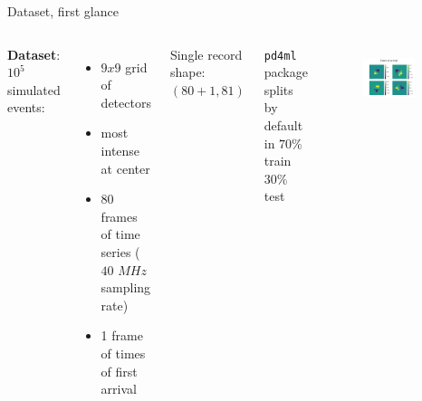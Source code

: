 \documentclass{beamer}
\begin{document}
\begin{frame}{Dataset, first glance}

    \begin{columns}
    
    \textbf{Dataset}: $10^5$ simulated events:
    \vspace{5 pt}

    \begin{itemize}
        \item[\textbullet] $9 x 9$ grid of detectors
        \item[\textbullet] most intense at center 
        \item[\textbullet] 80 frames of time series ($40$ $\si{MHz}$ sampling rate)
        \item[\textbullet] 1 frame of times of first arrival 
    \end{itemize}
    \vspace{10 pt}

    Single record shape: $(80 + 1 , 81)$\\
    \vspace{15 pt}

    \texttt{pd4ml} package splits by default in $70\%$ train $30\%$ test
    
    
        \begin{figure}
            \centering
            \includegraphics[width=0.8\textwidth]{figures/toa.png}
            \label{fig:my_label}
        \end{figure}
        

\end{columns}
\end{frame}
\end{document}
